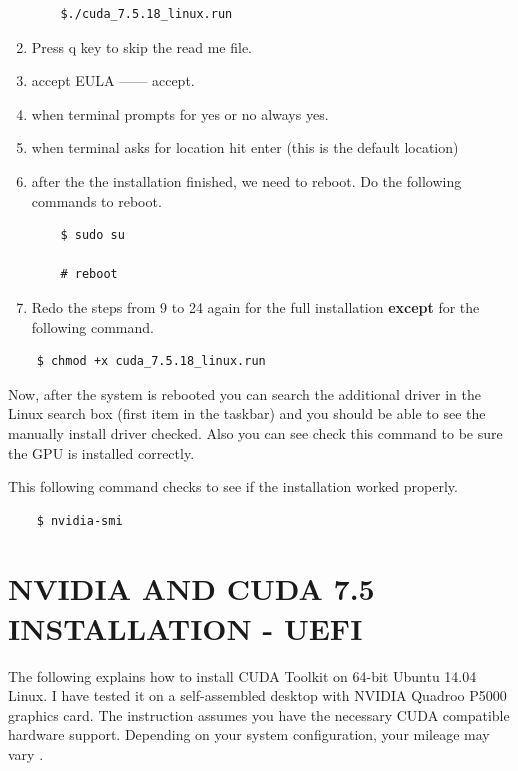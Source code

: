 \documentclass[12pt]{article}
\begin{document}
\begin{enumerate}
\begin{lstlisting}
    $./cuda_7.5.18_linux.run
\end{lstlisting}

\item Press q key to skip the read me file.
\item accept EULA ------ accept.
\item when terminal prompts for yes or no always yes.
\item when terminal asks for location hit enter (this is the default location)
\item after the the installation finished, we need to reboot. Do the following commands to reboot.

\begin{lstlisting}
    $ sudo su

    # reboot
\end{lstlisting}

\item Redo the steps from 9 to 24 again for the full installation \textbf{except} for the following command.
\end{enumerate}

\begin{lstlisting}
    $ chmod +x cuda_7.5.18_linux.run
\end{lstlisting}

Now, after the system is rebooted you can search the additional driver in the Linux search box (first item in the taskbar) and you should be able to see the manually install driver checked. Also you can see check this command to be sure the GPU is installed correctly.

This following command checks to see if the installation worked properly.

\begin{lstlisting}
    $ nvidia-smi
\end{lstlisting}

\newpage


\section{NVIDIA AND CUDA 7.5 INSTALLATION - UEFI}

The following explains how to install CUDA Toolkit on 64-bit Ubuntu 14.04 Linux. I have tested it on a self-assembled desktop with NVIDIA Quadroo P5000 graphics card. The instruction assumes you have the necessary CUDA compatible hardware support. Depending on your system configuration, your mileage may vary \cite{NVIDIADRIVER}.
\end{document}
